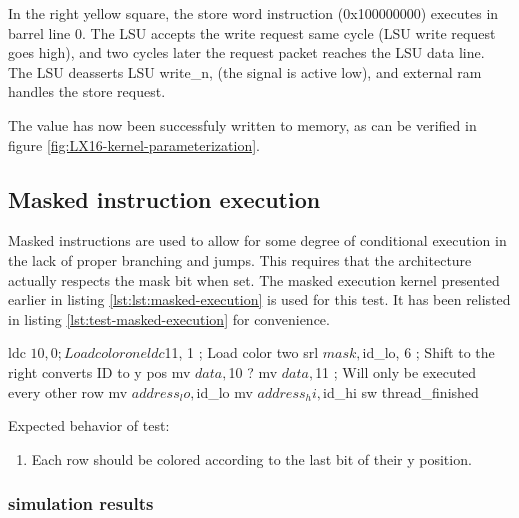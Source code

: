 \documentclass[../main/report.tex]{subfiles}
\begin{document}
In the right yellow square, the store word instruction (0x100000000) executes in barrel line 0.
The LSU accepts the write request same cycle (LSU write request goes high), and two cycles later the request packet reaches the LSU data line.
The LSU deasserts LSU write\_n, (the signal is active low), and external ram handles the store request.

The value has now been successfuly written to memory, as can be verified in figure \ref{fig:LX16-kernel-parameterization}.


\subsection{Masked instruction execution}

Masked instructions are used to allow for some degree of conditional execution in the lack of proper branching and jumps.
This requires that the architecture actually respects the mask bit when set.
The masked execution kernel presented earlier in listing \ref{lst:lst:masked-execution} is used for this test.
It has been relisted in listing \ref{lst:test-masked-execution} for convenience.

\begin{assembly}[caption=Conditional execution using predicated instructions, label=lst:test-masked-execution]
  ldc $10, 0 ; Load color one
  ldc $11, 1 ; Load color two
  srl $mask, $id_lo, 6 ; Shift to the right converts ID to y pos
  mv $data, $10
  ? mv $data, $11 ; Will only be executed every other row
  mv $address_lo, $id_lo
  mv $address_hi, $id_hi
  sw
  thread_finished
\end{assembly}

Expected behavior of test:
\begin{enumerate}
  \item
    Each row should be colored according to the last bit of their y position.
\end{enumerate}

\subsubsection*{simulation results}
\end{document}
